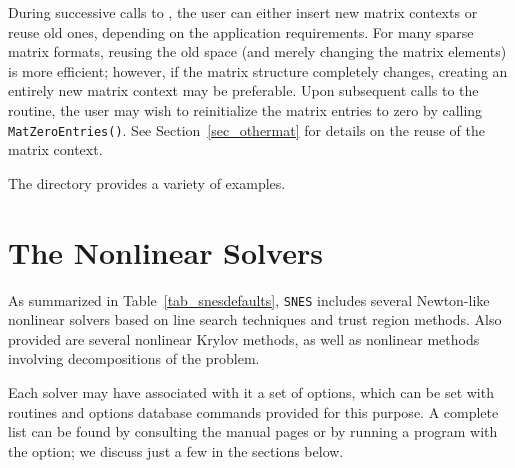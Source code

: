 During successive calls to , the user can either
insert new matrix contexts or reuse old ones, depending on the
application requirements. For many sparse matrix formats, reusing the
old space (and merely changing the matrix elements) is more efficient;
however, if the matrix structure completely changes, creating an
entirely new matrix context may be preferable.
Upon subsequent calls to the
 routine, the user may wish to reinitialize the matrix
entries to zero by calling \lstinline{MatZeroEntries()}.  See
Section~\ref{sec_othermat} for details on the reuse of the matrix
context.

The directory  provides
a variety of examples.


\section{The Nonlinear Solvers}
\label{sec_nlsolvers}

As summarized in Table~\ref{tab_snesdefaults}, \lstinline{SNES} includes several Newton-like nonlinear solvers based on line search
techniques and trust region methods.  Also provided are several nonlinear Krylov methods, as well as nonlinear
methods involving decompositions of the problem.

Each solver may have associated with it a set of options, which can be
set with routines and options database commands provided for this
purpose.  A complete list can be found by consulting the manual pages
or by running a program with the  option; we discuss just a
few in the sections below.

